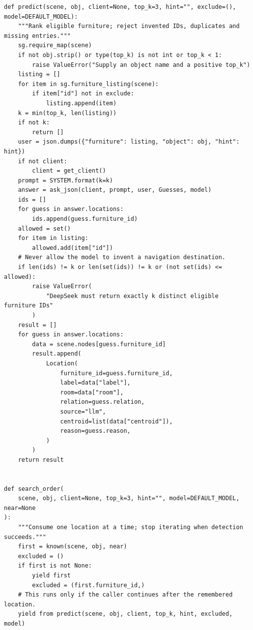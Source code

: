 \documentclass[11pt,a4paper]{book}
\begin{document}
\begin{lstlisting}
def predict(scene, obj, client=None, top_k=3, hint="", exclude=(), model=DEFAULT_MODEL):
    """Rank eligible furniture; reject invented IDs, duplicates and missing entries."""
    sg.require_map(scene)
    if not obj.strip() or type(top_k) is not int or top_k < 1:
        raise ValueError("Supply an object name and a positive top_k")
    listing = []
    for item in sg.furniture_listing(scene):
        if item["id"] not in exclude:
            listing.append(item)
    k = min(top_k, len(listing))
    if not k:
        return []
    user = json.dumps({"furniture": listing, "object": obj, "hint": hint})
    if not client:
        client = get_client()
    prompt = SYSTEM.format(k=k)
    answer = ask_json(client, prompt, user, Guesses, model)
    ids = []
    for guess in answer.locations:
        ids.append(guess.furniture_id)
    allowed = set()
    for item in listing:
        allowed.add(item["id"])
    # Never allow the model to invent a navigation destination.
    if len(ids) != k or len(set(ids)) != k or (not set(ids) <= allowed):
        raise ValueError(
            "DeepSeek must return exactly k distinct eligible furniture IDs"
        )
    result = []
    for guess in answer.locations:
        data = scene.nodes[guess.furniture_id]
        result.append(
            Location(
                furniture_id=guess.furniture_id,
                label=data["label"],
                room=data["room"],
                relation=guess.relation,
                source="llm",
                centroid=list(data["centroid"]),
                reason=guess.reason,
            )
        )
    return result


def search_order(
    scene, obj, client=None, top_k=3, hint="", model=DEFAULT_MODEL, near=None
):
    """Consume one location at a time; stop iterating when detection succeeds."""
    first = known(scene, obj, near)
    excluded = ()
    if first is not None:
        yield first
        excluded = (first.furniture_id,)
    # This runs only if the caller continues after the remembered location.
    yield from predict(scene, obj, client, top_k, hint, excluded, model)
\end{lstlisting}
\end{document}
